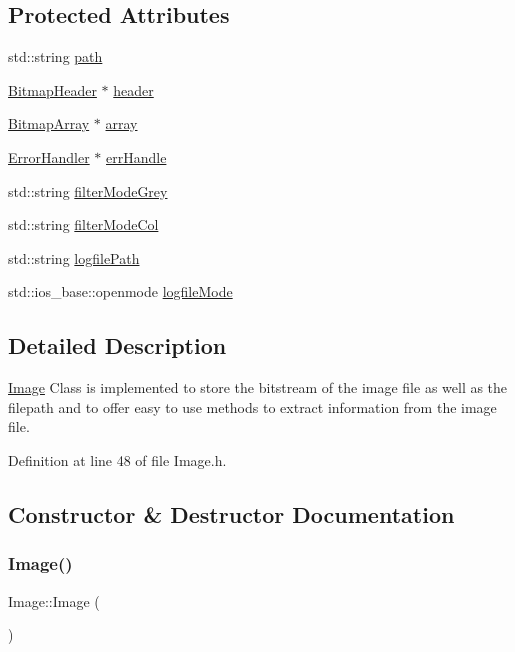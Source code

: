 \subsection*{Protected Attributes}
\begin{DoxyCompactItemize}
\item 
std\+::string \mbox{\hyperlink{classImage_aec8a33f176362d146da8c058798ebbff}{path}}
\item 
\mbox{\hyperlink{classBitmapHeader}{Bitmap\+Header}} $\ast$ \mbox{\hyperlink{classImage_adaf72c2df8979eafb4031dc0384dc49f}{header}}
\item 
\mbox{\hyperlink{classBitmapArray}{Bitmap\+Array}} $\ast$ \mbox{\hyperlink{classImage_a1c18dd7d9eda416d44e7eb408d5b3c38}{array}}
\item 
\mbox{\hyperlink{classErrorHandler}{Error\+Handler}} $\ast$ \mbox{\hyperlink{classImage_a560753c20e67a544be57bba971021375}{err\+Handle}}
\item 
std\+::string \mbox{\hyperlink{classImage_aa05610d5ebee3b0fce0463d2a0b1323f}{filter\+Mode\+Grey}}
\item 
std\+::string \mbox{\hyperlink{classImage_a0b4e4d5994ff72c9f3c99913037c627f}{filter\+Mode\+Col}}
\item 
std\+::string \mbox{\hyperlink{classImage_a6243d547194695512738b9606a9e081a}{logfile\+Path}}
\item 
std\+::ios\+\_\+base\+::openmode \mbox{\hyperlink{classImage_a992bf12c3ed95761bf6854922f26226a}{logfile\+Mode}}
\end{DoxyCompactItemize}


\subsection{Detailed Description}
\mbox{\hyperlink{classImage}{Image}} Class is implemented to store the bitstream of the image file as well as the filepath and to offer easy to use methods to extract information from the image file. 

Definition at line 48 of file Image.\+h.



\subsection{Constructor \& Destructor Documentation}
\mbox{\label{classImage_a58edd1c45b4faeb5f789b0d036d02313}} 
\subsubsection{\texorpdfstring{Image()}{Image()}\hspace{0.1cm}{\footnotesize\ttfamily [1/3]}}
{\footnotesize\ttfamily Image\+::\+Image (\begin{DoxyParamCaption}{ }\end{DoxyParamCaption})}




